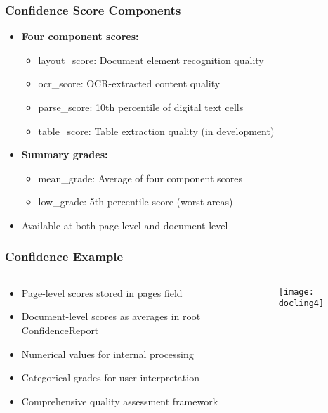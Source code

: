 \begin{frame}[fragile]\frametitle{Confidence Score Components}
      \begin{itemize}
	\item \textbf{Four component scores:}
	\begin{itemize}
		\item layout\_score: Document element recognition quality
		\item ocr\_score: OCR-extracted content quality
		\item parse\_score: 10th percentile of digital text cells
		\item table\_score: Table extraction quality (in development)
	\end{itemize}
	\item \textbf{Summary grades:}
	\begin{itemize}
		\item mean\_grade: Average of four component scores
		\item low\_grade: 5th percentile score (worst areas)
	\end{itemize}
	\item Available at both page-level and document-level
	  \end{itemize}
\end{frame}

\begin{frame}[fragile]\frametitle{Confidence Example}
\begin{columns}
    \begin{column}[T]{0.4\linewidth}
      \begin{itemize}
		\item Page-level scores stored in pages field
		\item Document-level scores as averages in root ConfidenceReport
		\item Numerical values for internal processing
		\item Categorical grades for user interpretation
		\item Comprehensive quality assessment framework
	  \end{itemize}

    \end{column}
    \begin{column}[T]{0.6\linewidth}
		\begin{center}
		\texttt{[image: docling4]}
		\end{center}	
    \end{column}
  \end{columns}
\end{frame}

